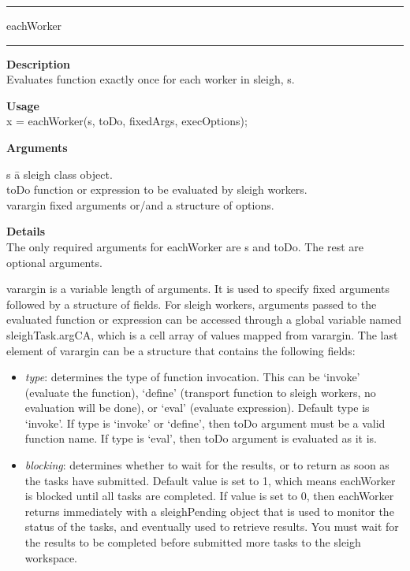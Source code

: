 \rule[0.06in]{6in}{0.01in}
\newline
eachWorker
\newline
\rule{6in}{0.01in}
\begin{list}{}{}
	\item {\bf Description}\\
     Evaluates function exactly once for each worker in sleigh, s. 
	\item {\bf Usage}\\     
     x = eachWorker(s, toDo, fixedArgs, execOptions);
	\item {\bf Arguments}
		\begin{tabbing}
		s \hspace{2.0cm} \= a sleigh class object.\\
		toDo \> function or expression to be evaluated by sleigh workers. \\
		varargin \> fixed arguments or/and a structure of options.
		\end{tabbing}
		
	\item {\bf Details}\\  
    The only required arguments for eachWorker are s and toDo. The rest are optional arguments. 
    
    varargin is a variable length of arguments. It is used to specify fixed arguments followed by a structure of fields. 
    For sleigh workers, arguments passed to the evaluated function or expression can be accessed through a global variable named sleighTask.argCA, 
    which is a cell array of values mapped from varargin. The last element of varargin can be a structure that contains the following fields:
  	\begin{itemize}
		\item \textit{type}: determines the type of function invocation. This can be `invoke' (evaluate the function), 
		`define' (transport function to sleigh workers, no evaluation will be done), or `eval' (evaluate expression).
		Default type is `invoke'. If type is `invoke' or `define', then toDo argument must be a valid function name. 
		If type is `eval', then toDo argument is evaluated as it is. 
		\item \textit{blocking}: determines whether to wait for the results, or to return as soon as the tasks have submitted. 
		Default value is set to 1, which means eachWorker is blocked until all tasks are completed. If value
		is set to 0, then eachWorker returns immediately with a sleighPending object that is used to monitor the 
		status of the tasks, and eventually used to retrieve results. You must wait for the results to be completed
		before submitted more tasks to the sleigh workspace. 
	\end{itemize}


\end{list}
